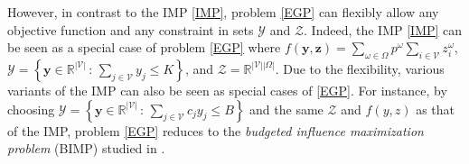 \documentclass[a4paper,10pt]{article}
\newcommand{\st}{\,:\,}
\newcommand{\V}{\mathcal{V}}
\theoremstyle{plain}
\begin{document}
	However, in contrast to the IMP \eqref{IMP}, problem \eqref{EGP} can flexibly allow any objective function and any constraint in sets $\mathcal{Y}$ and $\mathcal{Z}$.
	Indeed, the IMP \eqref{IMP} can be seen as a special case of problem \eqref{EGP} where 
	$f(\boldsymbol{y},\boldsymbol{z})=\sum_{\omega\in\Omega}p^{\omega}\sum_{i\in\V}z_i^{\omega}$,  $\mathcal{Y}=\left\{\boldsymbol{y}\in\mathbb{R}^{|\V|}\,:\,\sum_{j\in\V}y_j\leq K\right\}$, and $\mathcal{Z}=\mathbb{R}^{|\V||\Omega|}$.
	Due to the flexibility, various variants of the IMP can also be seen as special cases of \eqref{EGP}.
	For instance, by choosing $\mathcal{Y}=\left\{\boldsymbol{y}\in\mathbb{R}^{|\V|}\,:\,\sum_{j\in\V}c_jy_j\leq B\right\}$ and the same $\mathcal{Z}$ and $f(y,z)$ as that of the IMP, problem \eqref{EGP} reduces to the \emph{budgeted influence maximization problem} (BIMP) studied in \cite{nguyen2013budgeted}.
\end{document}
